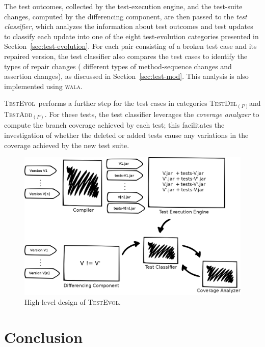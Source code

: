 \documentclass[conference]{IEEEtran}
\newcommand{\mt}{\mathit}
\newcommand{\catdelp}{\textsc{TestDel}$_\mt{(P)}$}
\newcommand{\cataddp}{\textsc{TestAdd}$_\mt{(P)}$}
\newcommand{\tool}{\textsc{TestEvol}\xspace}
\begin{document}
The test outcomes, collected by the test-execution engine, and the
test-suite changes, computed by the differencing component, are then
passed to the \emph{test classifier}, which analyzes the information
about test outcomes and test updates to classify each update into one
of the eight test-evolution categories presented in
Section~\ref{sec:test-evolution}.  For each pair consisting of a
broken test case and its repaired version, the test classifier also
compares the test cases to identify the types of repair changes (\eg
different types of method-sequence changes and assertion changes), as
discussed in Section~\ref{sec:test-mod}. This analysis is also
implemented using \textsc{wala}.

\tool\ performs a further step for the test cases in categories
\catdelp{}and \cataddp{}. For these tests, the test classifier
leverages the \emph{coverage analyzer} to compute the branch coverage
achieved by each test; this facilitates the investigation of whether
the deleted or added tests cause any variations in the coverage
achieved by the new test suite.

\begin{figure}
	\centering
	\includegraphics[width=\columnwidth]{architecture}
        \vspace*{-20pt}
	\caption{High-level design of \tool.}
        \vspace*{-8pt}
	\label{fig:trex}
\end{figure}

\vspace*{-8pt}
\section{Conclusion}
\label{sec:summary}
\end{document}
